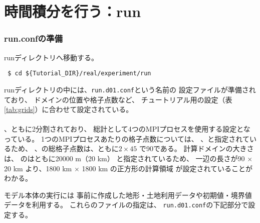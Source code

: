 \section{時間積分を行う：run} \label{sec:tutrial_real_run}
\subsubsection{run.confの準備}
runディレクトリへ移動する。
\begin{verbatim}
 $ cd ${Tutorial_DIR}/real/experiment/run
\end{verbatim}
%
runディレクトリの中には、\verb|run.d01.conf|という名前の
設定ファイルが準備されており、
ドメインの位置や格子点数など、
チュートリアル用の設定（表\ref{tab:grids}）に合わせて設定されている。\\

\\


{\XDIR} 、{\YDIR}ともに2分割されており、
総計として4つのMPIプロセスを使用する設定となっている。
1つのMPIプロセスあたりの格子点数については、
、と指定されているため、
{\XDIR} 、{\YDIR}の総格子点数は、ともに$2 \times 45$ で90である。
計算ドメインの大きさは、
のはともに20000 m（20 km）
と指定されているため、
一辺の長さが90 $\times$ 20 km より、1800 km $\times$ 1800 km の正方形の計算領域
が設定されていることがわかる。


モデル本体の実行には
事前に作成した地形・土地利用データや初期値・境界値データを利用する。
これらのファイルの指定は、
\verb|run.d01.conf|の下記部分で設定する。\\

